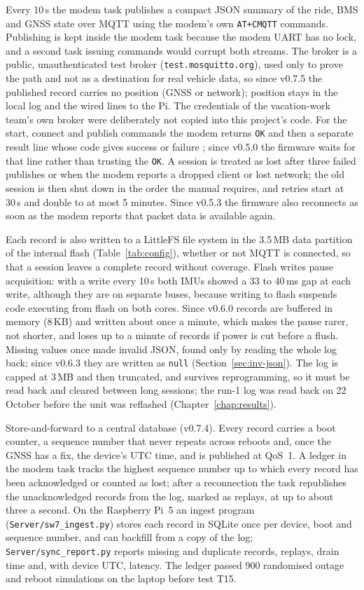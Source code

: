 Every 10\,s the modem task publishes a compact JSON summary of the ride, BMS and GNSS state over MQTT using the modem's own \texttt{AT+CMQTT} commands. Publishing is kept inside the modem task because the modem UART has no lock, and a second task issuing commands would corrupt both streams. The broker is a public, unauthenticated test broker (\texttt{test.mosquitto.org}), used only to prove the path and not as a destination for real vehicle data, so since v0.7.5 the published record carries no position (GNSS or network); position stays in the local log and the wired lines to the Pi. The credentials of the vacation-work team's own broker were deliberately not copied into this project's code. For the start, connect and publish commands the modem returns \texttt{OK} and then a separate result line whose code gives success or failure \cite{simcoma76xx}; since v0.5.0 the firmware waits for that line rather than trusting the \texttt{OK}. A session is treated as lost after three failed publishes or when the modem reports a dropped client or lost network; the old session is then shut down in the order the manual requires, and retries start at 30\,s and double to at most 5 minutes. Since v0.5.3 the firmware also reconnects as soon as the modem reports that packet data is available again.

Each record is also written to a LittleFS file system in the 3.5\,MB data partition of the internal flash (Table~\ref{tab:config}), whether or not MQTT is connected, so that a session leaves a complete record without coverage. Flash writes pause acquisition: with a write every 10\,s both IMUs showed a 33 to 40\,ms gap at each write, although they are on separate buses, because writing to flash suspends code executing from flash on both cores. Since v0.6.0 records are buffered in memory (8\,KB) and written about once a minute, which makes the pause rarer, not shorter, and loses up to a minute of records if power is cut before a flush. Missing values once made invalid JSON, found only by reading the whole log back; since v0.6.3 they are written as \texttt{null} (Section~\ref{sec:inv-json}). The log is capped at 3\,MB and then truncated, and survives reprogramming, so it must be read back and cleared between long sessions; the run-1 log was read back on 22 October before the unit was reflashed (Chapter~\ref{chap:results}).

Store-and-forward to a central database (v0.7.4). Every record carries a boot counter, a sequence number that never repeats across reboots and, once the GNSS has a fix, the device's UTC time, and is published at QoS~1. A ledger in the modem task tracks the highest sequence number up to which every record has been acknowledged or counted as lost; after a reconnection the task republishes the unacknowledged records from the log, marked as replays, at up to about three a second. On the Raspberry Pi~5 an ingest program (\texttt{Server/sw7\_ingest.py}) stores each record in SQLite once per device, boot and sequence number, and can backfill from a copy of the log; \texttt{Server/sync\_report.py} reports missing and duplicate records, replays, drain time and, with device UTC, latency. The ledger passed 900 randomised outage and reboot simulations on the laptop before test T15.


